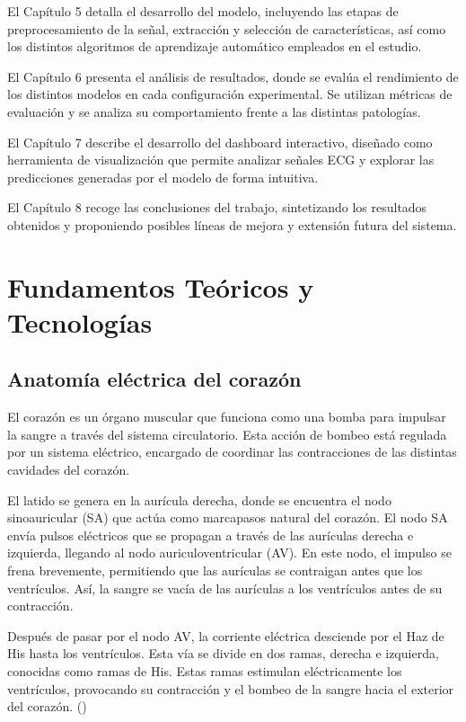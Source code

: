 \documentclass[12pt,a4paper,twoside]{book}
\begin{document}
El Capítulo 5 detalla el desarrollo del modelo, incluyendo las etapas de preprocesamiento de la señal, extracción y selección de características, así como los distintos algoritmos de aprendizaje automático empleados en el estudio.

El Capítulo 6 presenta el análisis de resultados, donde se evalúa el rendimiento de los distintos modelos en cada configuración experimental. 
Se utilizan métricas de evaluación y se analiza su comportamiento frente a las distintas patologías.

El Capítulo 7 describe el desarrollo del dashboard interactivo, diseñado como herramienta de visualización que permite analizar señales ECG y explorar las predicciones generadas por el modelo de forma intuitiva.

El Capítulo 8 recoge las conclusiones del trabajo, sintetizando los resultados obtenidos y proponiendo posibles líneas de mejora y extensión futura del sistema.


\chapter{Fundamentos Teóricos y Tecnologías}

\section{Anatomía eléctrica del corazón}

El corazón es un órgano muscular que funciona como una bomba para impulsar la sangre a través del sistema circulatorio. 
Esta acción de bombeo está regulada por un sistema eléctrico, encargado de coordinar las contracciones de las distintas cavidades del corazón.

El latido se genera en la aurícula derecha, donde se encuentra el nodo sinoauricular (SA) que actúa como marcapasos natural del corazón. 
El nodo SA envía pulsos eléctricos que se propagan a través de las aurículas derecha e izquierda, llegando al nodo auriculoventricular (AV). 
En este nodo, el impulso se frena brevemente, permitiendo que las aurículas se contraigan antes que los ventrículos. 
Así, la sangre se vacía de las aurículas a los ventrículos antes de su contracción.

Después de pasar por el nodo AV, la corriente eléctrica desciende por el Haz de His hasta los ventrículos. 
Esta vía se divide en dos ramas, derecha e izquierda, conocidas como ramas de His. 
Estas ramas estimulan eléctricamente los ventrículos, provocando su contracción y el bombeo de la sangre hacia el exterior del corazón. (\cite{stanford_electrical_system})
\end{document}
